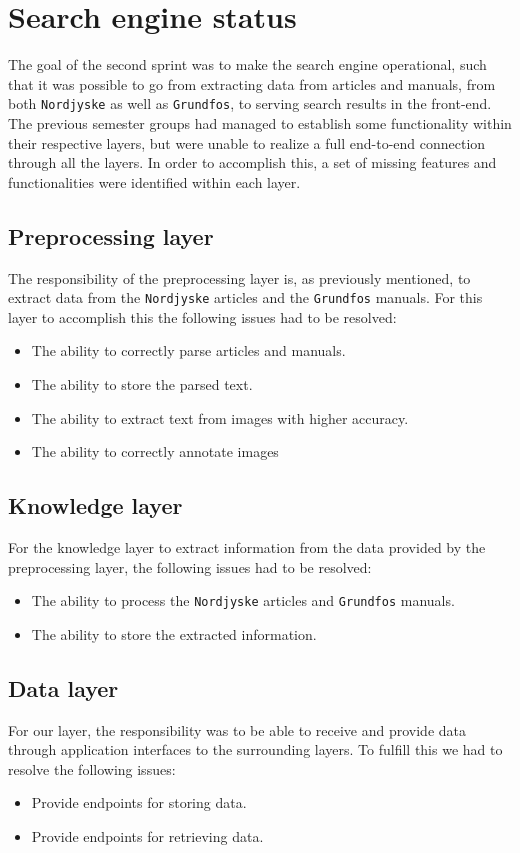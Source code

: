 \section*{Search engine status}
The goal of the second sprint was to make the search engine operational, such that it was possible to go from extracting data from articles and manuals, from both \texttt{Nordjyske} as well as \texttt{Grundfos}, to serving search results in the front-end. The previous semester groups had managed to establish some functionality within their respective layers, but were unable to realize a full end-to-end connection through all the layers. 
In order to accomplish this, a set of missing features and functionalities were identified within each layer.

\subsection*{Preprocessing layer}
The responsibility of the preprocessing layer is, as previously mentioned, to extract data from the \texttt{Nordjyske} articles and the \texttt{Grundfos} manuals. For this layer to accomplish this the following issues had to be resolved:
\begin{itemize}
    \item The ability to correctly parse articles and manuals.
    \item The ability to store the parsed text.
    \item The ability to extract text from images with higher accuracy.
    \item The ability to correctly annotate images 
\end{itemize}

\subsection*{Knowledge layer}
For the knowledge layer to extract information from the data provided by the preprocessing layer, the following issues had to be resolved:
\begin{itemize}
    \item The ability to process the \texttt{Nordjyske} articles and \texttt{Grundfos} manuals.
    \item The ability to store the extracted information.
\end{itemize}

\subsection*{Data layer}
For our layer, the responsibility was to be able to receive and provide data through application interfaces to the surrounding layers. To fulfill this we had to resolve the following issues:
\begin{itemize}
    \item Provide endpoints for storing data.
    \item Provide endpoints for retrieving data.
\end{itemize}

